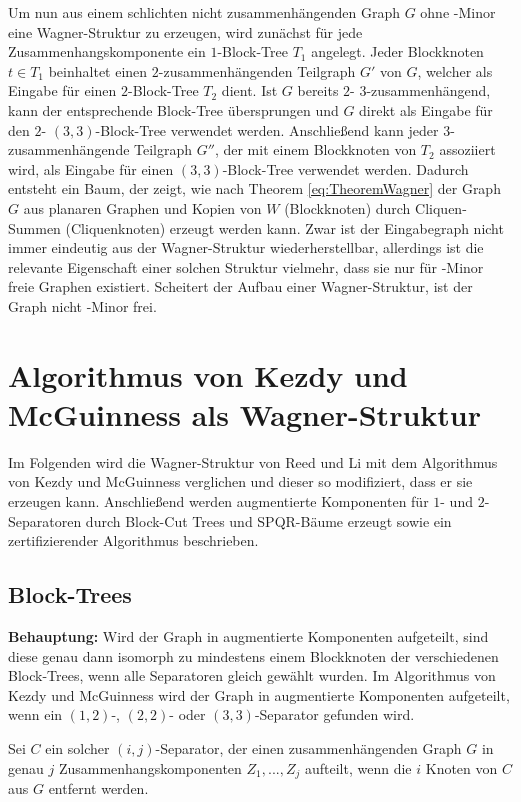 Um nun aus einem schlichten nicht zusammenhängenden Graph $G$ ohne \kf-Minor eine Wagner-Struktur zu erzeugen, wird zunächst für jede Zusammenhangskomponente ein $1$-Block-Tree $T_1$ angelegt.
Jeder Blockknoten $t \in T_1$ beinhaltet einen $2$-zusammenhängenden Teilgraph $G'$ von $G$, welcher als Eingabe für einen $2$-Block-Tree $T_2$ dient.
Ist $G$ bereits $2$- \bzw $3$-zusammenhängend, kann der entsprechende Block-Tree übersprungen und $G$ direkt als Eingabe für den $2$- \bzw $(3, 3)$-Block-Tree verwendet werden.
Anschließend kann jeder $3$-zusammenhängende Teilgraph $G''$, der mit einem Blockknoten von $T_2$ assoziiert wird, als Eingabe für einen $(3, 3)$-Block-Tree verwendet werden.
Dadurch entsteht ein Baum, der zeigt, wie nach Theorem \ref{eq:TheoremWagner} der Graph $G$ aus planaren Graphen und Kopien von $W$ (Blockknoten) durch Cliquen-Summen (Cliquenknoten) erzeugt werden kann.
Zwar ist der Eingabegraph nicht immer eindeutig aus der Wagner-Struktur wiederherstellbar, allerdings ist die relevante Eigenschaft einer solchen Struktur vielmehr, dass sie nur für \kf-Minor freie Graphen existiert.
Scheitert der Aufbau einer Wagner-Struktur, ist der Graph nicht \kf-Minor frei.


\section{Algorithmus von Kezdy und McGuinness als Wagner-Struktur}
Im Folgenden wird die Wagner-Struktur von Reed und Li mit dem Algorithmus von Kezdy und McGuinness verglichen und dieser so modifiziert, dass er sie erzeugen kann.
Anschließend werden augmentierte Komponenten für $1$- und $2$-Separatoren durch Block-Cut Trees und SPQR-Bäume erzeugt sowie ein zertifizierender Algorithmus beschrieben.

\subsection{Block-Trees}
\textbf{Behauptung:} Wird der Graph in augmentierte Komponenten aufgeteilt, sind diese genau dann isomorph zu mindestens einem Blockknoten der verschiedenen Block-Trees, wenn alle Separatoren gleich gewählt wurden.
Im Algorithmus von Kezdy und McGuinness wird der Graph in augmentierte Komponenten aufgeteilt, wenn ein $(1, 2)$-, $(2, 2)$- oder $(3, 3)$-Separator gefunden wird.

Sei $C$ ein solcher $(i, j)$-Separator, der einen zusammenhängenden Graph $G$ in genau $j$ Zusammenhangskomponenten $Z_1, ..., Z_j$ aufteilt, wenn die $i$ Knoten von $C$ aus $G$ entfernt werden.

